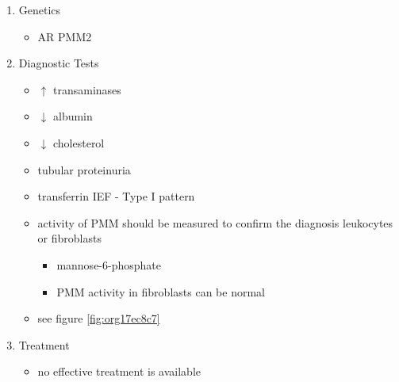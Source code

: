 \documentclass[12pt]{scrartcl}
\begin{document}
\begin{enumerate}
\begin{itemize}

\item GDP-mannose is used in the ER to assemble the dolichol-pyrophosphate
oligosaccharide precursor
\item defect leads to hypoglycosylation
\item deficiency and/or dysfunction of numerous glycoproteins:
\begin{itemize}
\item serum proteins:
\begin{itemize}
\item thyroxin-binding globulin, haptoglobin, clotting factor XI,
antithrombin III, cholinesterase
\end{itemize}
\item lysosomal enzymes
\item membrane bound glycoproteins
\end{itemize}
\end{itemize}

\item Genetics
\label{sec:org6698d45}
\begin{itemize}
\item AR PMM2
\end{itemize}

\item Diagnostic Tests
\label{sec:org3d9c057}
\begin{itemize}
\item \(\uparrow\) transaminases
\item \(\downarrow\) albumin
\item \(\downarrow\) cholesterol
\item tubular proteinuria
\item transferrin IEF - Type I pattern
\item activity of PMM should be measured to confirm the diagnosis
leukocytes or fibroblasts
\begin{itemize}
\item\relax [2-H\textsuperscript{3}]mannose-6-phosphate
\item PMM activity in fibroblasts can be normal
\end{itemize}
\item see figure \ref{fig:org17ec8c7}
\end{itemize}

\item Treatment
\label{sec:org4d03e65}
\begin{itemize}
\item no effective treatment is available
\end{itemize}
\end{enumerate}
\end{document}
